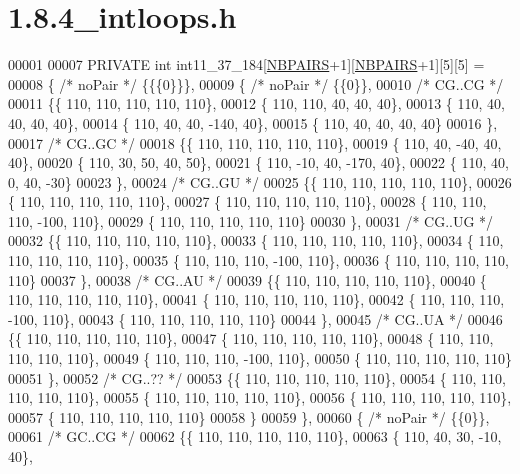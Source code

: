 \hypertarget{1_88_84__intloops_8h_source}{}\section{1.8.4\+\_\+intloops.h}
\label{1_88_84__intloops_8h_source}

\begin{DoxyCode}
00001 
00007 PRIVATE \textcolor{keywordtype}{int} int11\_37\_184[\hyperlink{energy__const_8h_a5e75221c779d618eab81e096f37e32ce}{NBPAIRS}+1][\hyperlink{energy__const_8h_a5e75221c779d618eab81e096f37e32ce}{NBPAIRS}+1][5][5] =
00008 \{ \textcolor{comment}{/* noPair */} \{\{\{0\}\}\},
00009 \{ \textcolor{comment}{/* noPair */} \{\{0\}\},
00010 \textcolor{comment}{/* CG..CG */}
00011 \{\{ 110, 110, 110, 110, 110\},
00012 \{ 110, 110,  40,  40,  40\},
00013 \{ 110,  40,  40,  40,  40\},
00014 \{ 110,  40,  40, -140,  40\},
00015 \{ 110,  40,  40,  40,  40\}
00016 \},
00017 \textcolor{comment}{/* CG..GC */}
00018 \{\{ 110, 110, 110, 110, 110\},
00019 \{ 110,  40, -40,  40,  40\},
00020 \{ 110,  30,  50,  40,  50\},
00021 \{ 110, -10,  40, -170,  40\},
00022 \{ 110,  40,   0,  40, -30\}
00023 \},
00024 \textcolor{comment}{/* CG..GU */}
00025 \{\{ 110, 110, 110, 110, 110\},
00026 \{ 110, 110, 110, 110, 110\},
00027 \{ 110, 110, 110, 110, 110\},
00028 \{ 110, 110, 110, -100, 110\},
00029 \{ 110, 110, 110, 110, 110\}
00030 \},
00031 \textcolor{comment}{/* CG..UG */}
00032 \{\{ 110, 110, 110, 110, 110\},
00033 \{ 110, 110, 110, 110, 110\},
00034 \{ 110, 110, 110, 110, 110\},
00035 \{ 110, 110, 110, -100, 110\},
00036 \{ 110, 110, 110, 110, 110\}
00037 \},
00038 \textcolor{comment}{/* CG..AU */}
00039 \{\{ 110, 110, 110, 110, 110\},
00040 \{ 110, 110, 110, 110, 110\},
00041 \{ 110, 110, 110, 110, 110\},
00042 \{ 110, 110, 110, -100, 110\},
00043 \{ 110, 110, 110, 110, 110\}
00044 \},
00045 \textcolor{comment}{/* CG..UA */}
00046 \{\{ 110, 110, 110, 110, 110\},
00047 \{ 110, 110, 110, 110, 110\},
00048 \{ 110, 110, 110, 110, 110\},
00049 \{ 110, 110, 110, -100, 110\},
00050 \{ 110, 110, 110, 110, 110\}
00051 \},
00052 \textcolor{comment}{/* CG..?? */}
00053 \{\{ 110, 110, 110, 110, 110\},
00054 \{ 110, 110, 110, 110, 110\},
00055 \{ 110, 110, 110, 110, 110\},
00056 \{ 110, 110, 110, 110, 110\},
00057 \{ 110, 110, 110, 110, 110\}
00058 \}
00059 \},
00060 \{ \textcolor{comment}{/* noPair */} \{\{0\}\},
00061 \textcolor{comment}{/* GC..CG */}
00062 \{\{ 110, 110, 110, 110, 110\},
00063 \{ 110,  40,  30, -10,  40\},

\end{DoxyCode}
